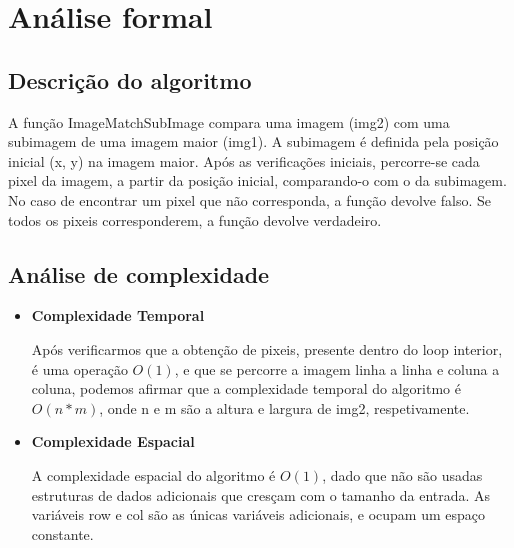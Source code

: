 \section{Análise formal}
\label{sec:imagematchsubimage/formal}

\subsection{Descrição do algoritmo}

A função ImageMatchSubImage compara uma imagem (img2) com uma subimagem de uma imagem maior (img1). A subimagem é definida pela posição inicial (x, y) na imagem maior. Após as verificações iniciais, percorre-se cada pixel da imagem, a partir da posição inicial, comparando-o com o da subimagem. No caso de encontrar um pixel que não corresponda, a função devolve falso. Se todos os pixeis corresponderem, a função devolve verdadeiro.

\subsection{Análise de complexidade}

\begin{itemize}
    
\item
\textbf{Complexidade Temporal}

Após verificarmos que a obtenção de pixeis, presente dentro do loop interior, é uma operação $O(1)$, e que se percorre a imagem linha a linha e coluna a coluna, podemos afirmar que a complexidade temporal do algoritmo é $O(n*m)$, onde n e m são a altura e largura de img2, respetivamente.

\item
\textbf{Complexidade Espacial}

A complexidade espacial do algoritmo é $O(1)$, dado que não são usadas estruturas de dados adicionais que cresçam com o tamanho da entrada. As variáveis row e col são as únicas variáveis adicionais, e ocupam um espaço constante.

\end{itemize}
